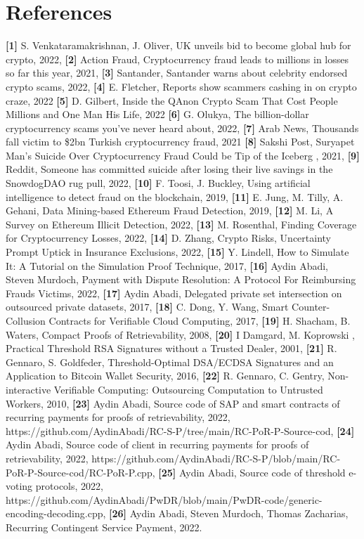 
\section*{References}
%
\textbf{[1]} S. Venkataramakrishnan, J. Oliver, UK unveils bid to become global hub for crypto, 2022, \textbf{[2]} Action Fraud, Cryptocurrency fraud leads to millions in losses so far this year, 2021, \textbf{[3]} Santander, Santander warns about celebrity endorsed crypto scams, 2022, \textbf{[4]} E. Fletcher, Reports show scammers cashing in on crypto craze, 2022
\textbf{[5]} D. Gilbert, Inside the QAnon Crypto Scam That Cost People Millions and One Man His Life, 2022 
\textbf{[6]} G. Olukya, The billion-dollar cryptocurrency scams you’ve never heard about, 2022,
\textbf{[7]} Arab News, Thousands fall victim to \$2bn Turkish cryptocurrency fraud, 2021
\textbf{[8]} Sakshi Post, Suryapet Man's Suicide Over Cryptocurrency Fraud Could be Tip of the Iceberg , 2021, \textbf{[9]} Reddit, Someone has committed suicide after losing their live savings in the SnowdogDAO rug pull, 2022, \textbf{[10]} F. Toosi, J. Buckley, Using artificial intelligence to detect fraud on the blockchain, 2019, \textbf{[11]} E. Jung, M. Tilly, A. Gehani, Data Mining-based Ethereum Fraud Detection, 2019, \textbf{[12]} M. Li, A Survey on Ethereum Illicit Detection, 2022, \textbf{[13]} M. Rosenthal, Finding Coverage for Cryptocurrency Losses, 2022, \textbf{[14]} D. Zhang, Crypto Risks, Uncertainty Prompt Uptick in Insurance Exclusions, 2022, \textbf{[15]} Y. Lindell, How to Simulate It: A Tutorial on the Simulation Proof Technique, 2017, \textbf{[16]} Aydin Abadi, Steven Murdoch, Payment with Dispute Resolution: A Protocol For Reimbursing Frauds Victims, 2022, \textbf{[17]} Aydin Abadi, Delegated private set intersection on outsourced private datasets, 2017, \textbf{[18]} C. Dong, Y. Wang, Smart Counter-Collusion Contracts for Verifiable Cloud Computing, 2017, \textbf{[19]} H. Shacham, B. Waters, Compact Proofs of Retrievability, 2008, \textbf{[20]} I Damgard, M. Koprowski , Practical Threshold RSA Signatures without a Trusted Dealer, 2001, \textbf{[21]} R. Gennaro, S. Goldfeder, Threshold-Optimal DSA/ECDSA Signatures and an Application to Bitcoin Wallet Security, 2016,  \textbf{[22]} R. Gennaro, C. Gentry, Non-interactive Verifiable Computing: Outsourcing Computation to Untrusted Workers, 2010, \textbf{[23]} Aydin Abadi, Source code of SAP and smart contracts of recurring payments for proofs of retrievability, 2022, https://github.com/AydinAbadi/RC-S-P/tree/main/RC-PoR-P-Source-cod, \textbf{[24]} Aydin Abadi, Source code of client in recurring payments for proofs of retrievability, 2022, https://github.com/AydinAbadi/RC-S-P/blob/main/RC-PoR-P-Source-cod/RC-PoR-P.cpp, \textbf{[25]} Aydin Abadi, Source code of threshold e-voting protocols, 2022, https://github.com/AydinAbadi/PwDR/blob/main/PwDR-code/generic-encoding-decoding.cpp, \textbf{[26]} Aydin Abadi, Steven Murdoch, Thomas Zacharias, Recurring Contingent Service Payment, 2022. 


